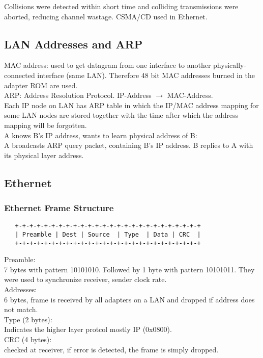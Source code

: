 \documentclass[10pt, a4paper, twocolumn]{scrartcl}
\begin{document}
Collisions were detected within short time and colliding transmissions were aborted, reducing channel wastage. CSMA/CD used in Ethernet.

\subsection{LAN Addresses and ARP}

MAC address: used to get datagram from one interface to another physically-connected interface (same LAN). Therefore 48 bit MAC addresses burned in the adapter ROM are used.\\

ARP: Address Resolution Protocol. IP-Address $\rightarrow$ MAC-Address.\\

Each IP node on LAN has ARP table in which the IP/MAC address mapping for some LAN nodes are stored together with the time after which the address mapping will be forgotten.\\

A knows B's IP address, wants to learn physical address of B:\\
A broadcasts ARP query packet, containing B's IP address. B replies to A with its physical layer address.

\subsection{Ethernet}

\subsubsection{Ethernet Frame Structure}

\scriptsize
\begin{verbatim}
   +-+-+-+-+-+-+-+-+-+-+-+-+-+-+-+-+-+-+-+-+-+-+-+-+-+
   | Preamble | Dest | Source  | Type  | Data | CRC  |
   +-+-+-+-+-+-+-+-+-+-+-+-+-+-+-+-+-+-+-+-+-+-+-+-+-+
\end{verbatim}
\normalsize

Preamble:\\
7 bytes with pattern 10101010. Followed by 1 byte with pattern 10101011. They were used to synchronize receiver, sender clock rate.\\
Addresses:\\
6 bytes, frame is received by all adapters on a LAN and dropped if address does not match.\\
Type (2 bytes):\\
Indicates the higher layer protcol mostly IP (0x0800).\\
CRC (4 bytes):\\
checked at receiver, if error is detected, the frame is simply dropped.
\end{document}
